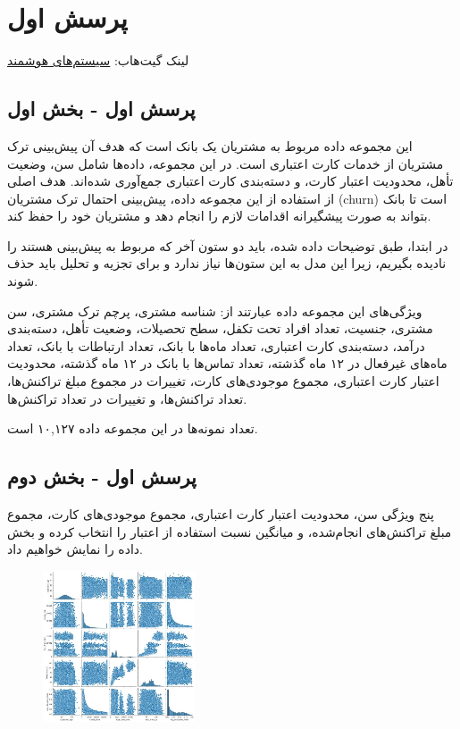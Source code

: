 \documentclass{article}
\title{\assignment}
\author{
    محمدمهدی کرمی \\
    \texttt{mmehdi.karami@email.kntu.ac.ir}
}
\date{\university
\faculty
\course}
\begin{document}
\maketitle

\section{پرسش اول}

لینک گیت‌هاب: \href{https://github.com/username/repository}{سیستم‌های هوشمند}

\subsection{پرسش اول - بخش اول}
این مجموعه داده مربوط به مشتریان یک بانک است که هدف آن پیش‌بینی ترک مشتریان از خدمات کارت اعتباری است. در این مجموعه، داده‌ها شامل سن، وضعیت تأهل، محدودیت اعتبار کارت، و دسته‌بندی کارت اعتباری جمع‌آوری شده‌اند. هدف اصلی از استفاده از این مجموعه داده، پیش‌بینی احتمال ترک مشتریان (churn) است تا بانک بتواند به صورت پیشگیرانه اقدامات لازم را انجام دهد و مشتریان خود را حفظ کند.

در ابتدا، طبق توضیحات داده شده، باید دو ستون آخر که مربوط به پیش‌بینی هستند را نادیده بگیریم، زیرا این مدل به این ستون‌ها نیاز ندارد و برای تجزیه و تحلیل باید حذف شوند.

ویژگی‌های این مجموعه داده عبارتند از:
شناسه مشتری، پرچم ترک مشتری، سن مشتری، جنسیت، تعداد افراد تحت تکفل، سطح تحصیلات، وضعیت تأهل، دسته‌بندی درآمد، دسته‌بندی کارت اعتباری، تعداد ماه‌ها با بانک، تعداد ارتباطات با بانک، تعداد ماه‌های غیرفعال در ۱۲ ماه گذشته، تعداد تماس‌ها با بانک در ۱۲ ماه گذشته، محدودیت اعتبار کارت اعتباری، مجموع موجودی‌های کارت، تغییرات در مجموع مبلغ تراکنش‌ها، تعداد تراکنش‌ها، و تغییرات در تعداد تراکنش‌ها.

تعداد نمونه‌ها در این مجموعه داده ۱۰,۱۲۷ است.

\subsection{پرسش اول - بخش دوم}
پنج ویژگی سن، محدودیت اعتبار کارت اعتباری، مجموع موجودی‌های کارت، مجموع مبلغ تراکنش‌های انجام‌شده، و میانگین نسبت استفاده از اعتبار را انتخاب کرده و بخش داده را نمایش خواهیم داد.

\begin{figure}[!h]
    \centering
    \includegraphics[width=0.4\textwidth]{img/1.png}
\end{figure}
\end{document}
